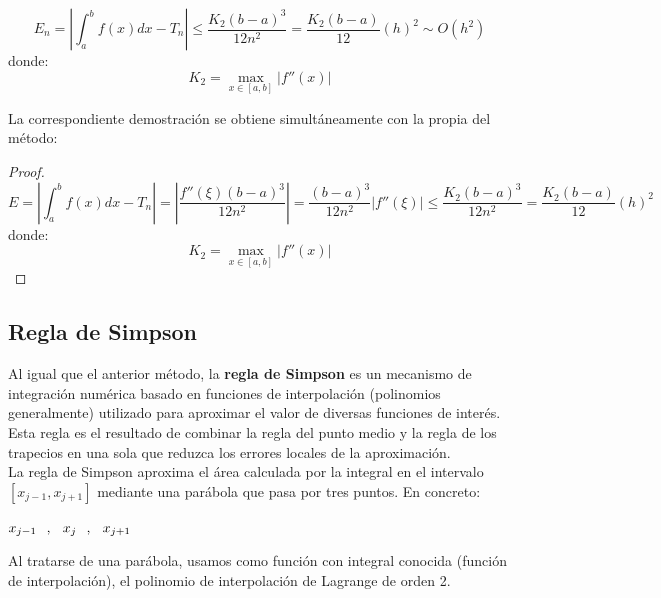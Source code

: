 \documentclass[12pt]{article}
\begin{document}
$$
E_n = \left| \int_{a}^{b} f(x)dx  - T_n\right| \leq \frac{K_2(b-a)^3}{12n^2}= \frac{K_2(b-a)}{12}(h)^2 \sim O(h^2)
$$
donde:
$$
K_2 = \max_{x \in [a, b]} |f''(x)|
$$

La correspondiente demostración se obtiene simultáneamente con la propia del método:

\begin{proof}
\[
E = \left|\int_{a}^{b} f (x)dx -T_n\right| = \left|\frac{f''(\xi)(b -a)^3}{12n^2}\right| = \frac{(b-a)^3}{12n^2} |f''(\xi)| \leq \frac{K_2(b -a)^3}{12n^2} = \frac{K_2(b-a)}{12} (h)^2
\]
donde:
\[
K_2 = \max_{x\in[a,b]} |f''(x)| 
\]
\end{proof}


\subsection{Regla de Simpson}

Al igual que el anterior método, la \textbf{regla de Simpson} es un mecanismo de integración numérica basado en funciones de interpolación (polinomios generalmente) utilizado para aproximar el valor de diversas funciones de interés. Esta regla es el resultado de combinar la regla del punto medio y la regla de los trapecios en una sola que reduzca los errores locales de la aproximación.\\

La regla de Simpson aproxima el área calculada por la integral en el intervalo $[x_{j-1} , x_{j+1}]$ mediante una parábola que pasa por tres puntos. En concreto:

\begin{center}
$x_{j-1} \hspace{2.5mm},\hspace{2.5mm} x_{j} \hspace{2.5mm},\hspace{2.5mm} x_{j+1}$
\end{center}

Al tratarse de una parábola, usamos como función con integral conocida (función de interpolación), el polinomio de interpolación de Lagrange de orden 2.\\
\end{document}
